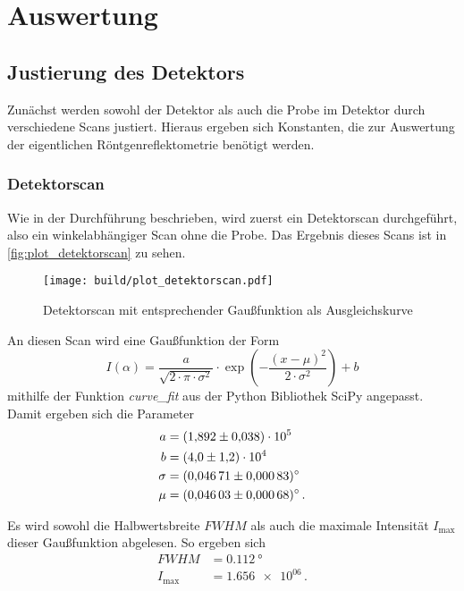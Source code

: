 \section{Auswertung}
\label{sec:Auswertung}

\subsection{Justierung des Detektors}
\label{ssec:Justierung}

Zunächst werden sowohl der Detektor als auch die Probe im Detektor durch verschiedene Scans justiert.
Hieraus ergeben sich Konstanten, die zur Auswertung der eigentlichen Röntgenreflektometrie benötigt werden.

\subsubsection{Detektorscan}
\label{sssec:Detektorscan}

Wie in der Durchführung beschrieben, wird zuerst ein Detektorscan durchgeführt, also ein winkelabhängiger Scan ohne die Probe.
Das Ergebnis dieses Scans ist in \autoref{fig:plot_detektorscan} zu sehen. 

\begin{figure}
    \centering
    \texttt{[image: build/plot\_detektorscan.pdf]}
    \caption{Detektorscan mit entsprechender Gaußfunktion als Ausgleichskurve}
    \label{fig:plot_detektorscan}
\end{figure}

An diesen Scan wird eine Gaußfunktion der Form
\begin{equation}
    I(\alpha) = \frac{a}{\sqrt{2 \cdot \pi \cdot \sigma^2}} \cdot \exp\left(-\frac{(x - \mu)^2}{2 \cdot \sigma^2}\right) + b
\end{equation}
mithilfe der Funktion \textit{curve\_fit} aus der Python Bibliothek SciPy angepasst.\cite{scipy}
Damit ergeben sich die Parameter 
\begin{align*}
    a &= \num{1.892+-0.038e+05} \\
    b &= \num{4.0+-1.2e+04} \\
    \sigma &= \SI{0.04671+-0.00083}{\degree} \\
    \mu &= \SI{0.04603+-0.00068}{\degree} \, .
\end{align*}

Es wird sowohl die Halbwertsbreite $FWHM$ als auch die maximale Intensität $I_\text{max}$ dieser Gaußfunktion abgelesen.
So ergeben sich
\begin{align*}
    FWHM &= \SI{0.112}{\degree} \\
    I_\text{max} &= \num{1.656e+06} \, .
\end{align*}

